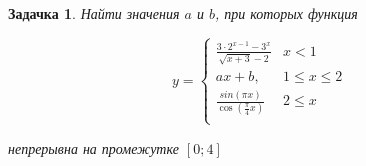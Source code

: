 \documentclass[a4paper,12pt]{article}
\newtheorem*{task}{Задачка}
\begin{document}
        \begin{task}
            Найти значения $a$ и $b$, при которых функция

            \begin{equation*}
                y = 
                 \begin{cases}
                   \frac{3\cdot 2^{x - 1} - 3 ^ x}{\sqrt{x + 3} - 2} &\text{$x < 1$}\\
                   ax + b, &\text{$1 \leq x \leq 2$}\\
                   \frac{sin(\pi x)}{\cos(\frac{\pi} {4} x)}  &\text{$2 \leq x$}\\
                 \end{cases}
            \end{equation*}

            непрерывна на промежутке $[0; 4]$
        \end{task}
\end{document}
